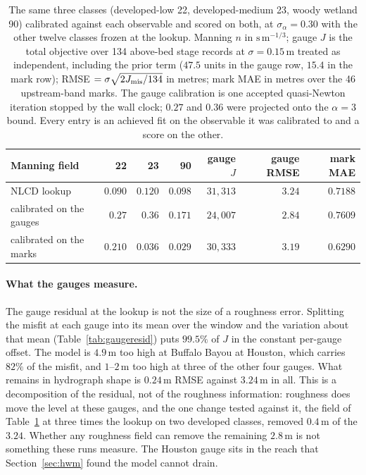 \documentclass[11pt]{article}
\begin{document}
\begin{table}
\centering\small
\begin{tabular}{@{}lrrrrrr@{}}
\toprule
Manning field & 22 & 23 & 90 & gauge $J$ & gauge RMSE & mark MAE \\
\midrule
NLCD lookup & $0.090$ & $0.120$ & $0.098$ & $31{,}313$ & $3.24$ & $0.7188$ \\
calibrated on the gauges & $0.27$ & $0.36$ & $0.171$ & $24{,}007$ & $2.84$ & $0.7609$ \\
calibrated on the marks & $0.210$ & $0.036$ & $0.029$ & $30{,}333$ & $3.19$ & $0.6290$ \\
\bottomrule
\end{tabular}
\caption{The same three classes (developed-low 22, developed-medium 23,
woody wetland 90) calibrated against each observable and scored on
both, at $\sigma_\alpha = 0.30$ with the other twelve classes frozen at
the lookup. Manning $n$ in $\mathrm{s\,m^{-1/3}}$; gauge $J$ is the
total objective over 134 above-bed stage records at $\sigma = 0.15$\,m
treated as independent, including the prior term ($47.5$ units in the
gauge row, $15.4$ in the mark row); RMSE $= \sigma\sqrt{2J_{\rm
mis}/134}$ in metres; mark MAE in metres over
the 46 upstream-band marks. The gauge calibration is one accepted
quasi-Newton iteration stopped by the wall clock; $0.27$ and $0.36$
were projected onto the $\alpha = 3$ bound. Every entry is an
achieved fit on the observable it was calibrated to and a score on
the other.}
\label{tab:crossobs}
\end{table}

\paragraph{What the gauges measure.}
The gauge residual at the lookup is not the size of a roughness
error. Splitting the misfit at each gauge into its mean over the
window and the variation about that mean (Table~\ref{tab:gaugeresid})
puts $99.5\%$ of $J$ in the constant per-gauge offset. The model is
$4.9$\,m too high at Buffalo Bayou at Houston, which carries $82\%$ of
the misfit, and $1$--$2$\,m too high at three of the other four
gauges. What remains in hydrograph shape is $0.24$\,m RMSE against
$3.24$\,m in all. This is a decomposition of the residual, not of the
roughness information: roughness does move the level at these gauges,
and the one change tested against it, the field of
Table~\ref{tab:crossobs} at three times the lookup on two developed
classes, removed $0.4$\,m of the $3.24$. Whether any roughness field
can remove the remaining $2.8$\,m is not something these runs
measure. The Houston gauge sits in the reach that
Section~\ref{sec:hwm} found the model cannot drain.
\end{document}
